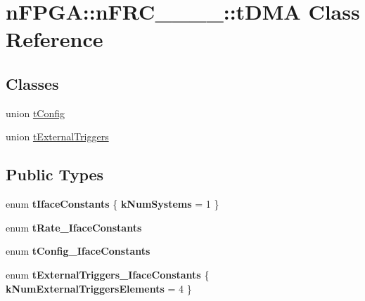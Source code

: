 \hypertarget{classnFPGA_1_1nFRC__2012__1__6__4_1_1tDMA}{
\section{nFPGA::nFRC\_\_\_\_::tDMA Class Reference}
\label{classnFPGA_1_1nFRC__2012__1__6__4_1_1tDMA}
}
\subsection*{Classes}
\begin{DoxyCompactItemize}
\item 
union \hyperlink{unionnFPGA_1_1nFRC__2012__1__6__4_1_1tDMA_1_1tConfig}{tConfig}
\item 
union \hyperlink{unionnFPGA_1_1nFRC__2012__1__6__4_1_1tDMA_1_1tExternalTriggers}{tExternalTriggers}
\end{DoxyCompactItemize}
\subsection*{Public Types}
\begin{DoxyCompactItemize}
\item 
enum {\bfseries tIfaceConstants} \{ {\bfseries kNumSystems} =  1
 \}
\item 
enum {\bfseries tRate\_\-IfaceConstants} 
\item 
enum {\bfseries tConfig\_\-IfaceConstants} 
\item 
enum {\bfseries tExternalTriggers\_\-IfaceConstants} \{ {\bfseries kNumExternalTriggersElements} =  4
 \}
\end{DoxyCompactItemize}
